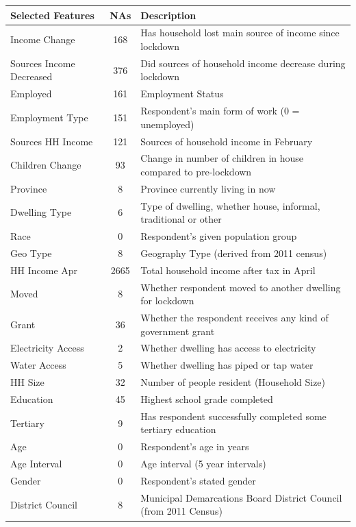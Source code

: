 \documentclass[11pt,preprint, authoryear]{elsarticle}
\let\origtable\table
\let\endorigtable\endtable
\renewenvironment{table}[1][2] {
    \expandafter\origtable\expandafter[H]
} {
    \endorigtable
}
\numberwithin{equation}{section}
\numberwithin{figure}{section}
\numberwithin{table}{section}
\begin{document}
\begin{table}
\begin{center}
\begin{tabular}{ |l|c|l| } 
 \hline
 Selected Features & NAs & Description \\ 
 \hline
  Income Change & 168 &  Has household lost main source of income since lockdown \\ 
  Sources Income Decreased & 376 & Did sources of household income decrease during lockdown \\
  Employed & 161 &  Employment Status \\
  Employment Type & 151 & Respondent's main form of work (0 = unemployed) \\
  Sources HH Income & 121 & Sources of household income in February \\
  Children Change & 93 & Change in number of children in house compared to pre-lockdown \\
  Province & 8 & Province currently living in now \\
  Dwelling Type & 6 & Type of dwelling, whether house, informal, traditional or other \\
  Race & 0 & Respondent's given population group \\
  Geo Type & 8 & Geography Type (derived from 2011 census) \\
  HH Income Apr & 2665 & Total household income after tax in April \\
  Moved & 8 & Whether respondent moved to another dwelling for lockdown \\
  Grant & 36 & Whether the respondent receives any kind of government grant \\
  Electricity Access & 2 & Whether dwelling has access to electricity \\
  Water Access & 5 & Whether dwelling has piped or tap water \\
  HH Size & 32 & Number of people resident (Household Size) \\
  Education & 45 & Highest school grade completed \\
  Tertiary & 9 & Has respondent successfully completed some tertiary education \\
  Age & 0 & Respondent's age in years \\
  Age Interval & 0 & Age interval (5 year intervals) \\
  Gender & 0 & Respondent's stated gender \\
  District Council & 8 & Municipal Demarcations Board District Council (from 2011 Census) \\
  \hline
\end{tabular}
\caption{Features}
\label{Features}
\end{center}
\end{table}
\end{document}
